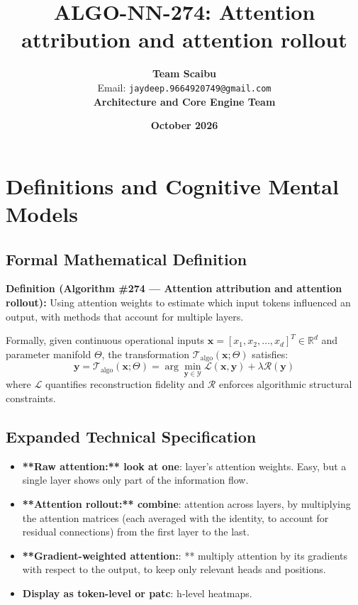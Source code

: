 \documentclass[11pt,a4paper]{article}
\title{\textbf{ALGO-NN-274: Attention attribution and attention rollout}}
\author{\textbf{Team Scaibu} \\ \small Email: \texttt{jaydeep.9664920749@gmail.com} \\ \small \textbf{Architecture and Core Engine Team}}
\date{\textbf{October 2026}}
\theoremstyle{definition}
\begin{document}
\maketitle

\section{Definitions and Cognitive Mental Models}

\subsection{Formal Mathematical Definition}
\textbf{Definition (Algorithm \#274 --- Attention attribution and attention rollout):}
Using attention weights to estimate which input tokens influenced an output, with methods that account for multiple layers.

Formally, given continuous operational inputs $\mathbf{x} = [x_1, x_2, \dots, x_d]^T \in \mathbb{R}^d$ and parameter manifold $\Theta$, the transformation $\mathcal{T}_{\text{algo}}(\mathbf{x}; \Theta)$ satisfies:
{\boldmath
\begin{equation}
\mathbf{y} = \mathcal{T}_{\text{algo}}(\mathbf{x}; \Theta) = \arg\min_{\mathbf{y} \in \mathcal{Y}} \mathcal{L}(\mathbf{x}, \mathbf{y}) + \lambda \mathcal{R}(\mathbf{y})
\end{equation}
}
where $\mathcal{L}$ quantifies reconstruction fidelity and $\mathcal{R}$ enforces algorithmic structural constraints.

\subsection{Expanded Technical Specification}
\begin{itemize}
\item \textbf{**Raw attention:** look at one}:  layer's attention weights. Easy, but a single layer shows only part of the information flow.
\item \textbf{**Attention rollout:** combine}:  attention across layers, by multiplying the attention matrices (each averaged with the identity, to account for residual connections) from the first layer to the last.
\item \textbf{**Gradient-weighted attention:}: ** multiply attention by its gradients with respect to the output, to keep only relevant heads and positions.
\item \textbf{Display as token-level or patc}: h-level heatmaps.
\end{itemize}
\end{document}

